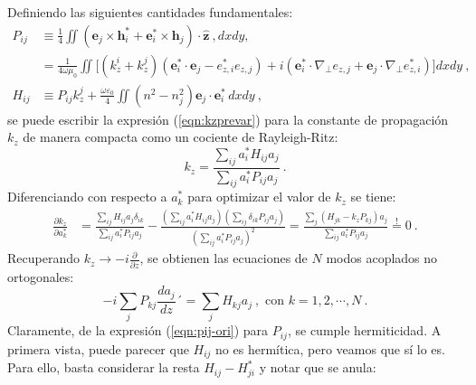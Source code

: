 Definiendo las siguientes cantidades fundamentales:
\begin{align}
	P_{ij} &\equiv \frac{1}{4} \iint \left( \textbf{e}_j \times \textbf{h}_i^* + \textbf{e}_i^* \times \textbf{h}_j \right) \cdot \hat{\textbf{z}} \ , dxdy, \label{eqn:pij-ori} \\
	&= \frac{1}{4 \omega \mu_0} \iint \Big[ 
	(k_z^i + k_z^j) \left( \textbf{e}_i^* \cdot \textbf{e}_j - e_{z,i}^* e_{z,j} \right)  + i \left( \textbf{e}_i^* \cdot \nabla_\perp e_{z,j} + \textbf{e}_j \cdot \nabla_\perp e_{z,i}^* \right) \Big] dxdy \ , \label{eqn:pij-simpli} \\
	H_{ij} &\equiv P_{ij} k_z^j + \frac{\omega \varepsilon_0}{4} \iint (n^2-n_j^2) \textbf{e}_j \cdot \textbf{e}_i^* \, dxdy \ , \label{eqn:hij}
\end{align}
se puede escribir la expresión (\ref{eqn:kzprevar}) para la constante de propagación $k_z$ de manera compacta como un cociente de Rayleigh-Ritz:
\begin{equation}
	k_z = \frac{\sum_{ij} a_i^* H_{ij} a_j}{\sum_{ij} a_i^*P_{ij} a_j} \ .
\end{equation}
Diferenciando con respecto a $a_k^*$ para optimizar el valor de $k_z$ se tiene:
\begin{align}
	\frac{\partial k_z}{\partial a_k^*} &= \frac{\sum_{ij} H_{ij} a_j \delta_{ik}}{\sum_{ij} a_i^*P_{ij} a_j} - \frac{\left(\sum_{ij} a_i^* H_{ij} a_j\right) \left( 
	\sum_{ij} \delta_{ik} P_{ij} a_j \right) }{\left(\sum_{ij} a_i^*P_{ij} a_j\right)^2} = \frac{\sum_{j} \left(H_{jk}  - k_z P_{kj} \right) a_j}{\sum_{ij} a_i^* P_{ij}a_j} \overset{!}{=} 0 \ .
\end{align}
Recuperando $k_z \to -i\frac{\partial}{\partial z}$, se obtienen las ecuaciones de $N$ modos acoplados no ortogonales:
\begin{equation}
	-i \sum_{j} P_{kj} \frac{d a_j}{dz} ´= \sum_{j} H_{kj} a_j \ , \text{ con }k=1,2,\cdots,N \ . \label{eqn:non-ortho-CMT-eqs}
\end{equation}
Claramente, de la expresión (\ref{eqn:pij-ori}) para $P_{ij}$, se cumple hermiticidad. A primera vista, puede parecer que $H_{ij}$ no es hermítica, pero veamos que sí lo es. Para ello, basta considerar la resta $H_{ij} - H_{ji}^*$ y notar que se anula:
